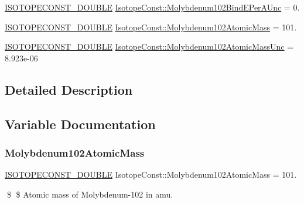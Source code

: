 \begin{DoxyCompactItemize}
\mbox{\hyperlink{group___isotope_const-_macros_ga8f45a7272ce02c0b4c65c44636ed719a}{I\+S\+O\+T\+O\+P\+E\+C\+O\+N\+S\+T\+\_\+\+D\+O\+U\+B\+LE}} \mbox{\hyperlink{group___isotope_const-_molybdenum-_mo102_ga053c88dbcae9cad5e8be1ad7f7e8f947}{Isotope\+Const\+::\+Molybdenum102\+Bind\+E\+Per\+A\+Unc}} = 0.
\item 
\mbox{\hyperlink{group___isotope_const-_macros_ga8f45a7272ce02c0b4c65c44636ed719a}{I\+S\+O\+T\+O\+P\+E\+C\+O\+N\+S\+T\+\_\+\+D\+O\+U\+B\+LE}} \mbox{\hyperlink{group___isotope_const-_molybdenum-_mo102_gaaacc2cb8568a3823fb5e4d5189ef7d54}{Isotope\+Const\+::\+Molybdenum102\+Atomic\+Mass}} = 101.
\item 
\mbox{\hyperlink{group___isotope_const-_macros_ga8f45a7272ce02c0b4c65c44636ed719a}{I\+S\+O\+T\+O\+P\+E\+C\+O\+N\+S\+T\+\_\+\+D\+O\+U\+B\+LE}} \mbox{\hyperlink{group___isotope_const-_molybdenum-_mo102_gacdcf42194c83c251a90b50d6511ea8f0}{Isotope\+Const\+::\+Molybdenum102\+Atomic\+Mass\+Unc}} = 8.\+923e-\/06
\end{DoxyCompactItemize}


\subsection{Detailed Description}


\subsection{Variable Documentation}
\mbox{\label{group___isotope_const-_molybdenum-_mo102_gaaacc2cb8568a3823fb5e4d5189ef7d54}} 
\subsubsection{\texorpdfstring{Molybdenum102\+Atomic\+Mass}{Molybdenum102AtomicMass}}
{\footnotesize\ttfamily \mbox{\hyperlink{group___isotope_const-_macros_ga8f45a7272ce02c0b4c65c44636ed719a}{I\+S\+O\+T\+O\+P\+E\+C\+O\+N\+S\+T\+\_\+\+D\+O\+U\+B\+LE}} Isotope\+Const\+::\+Molybdenum102\+Atomic\+Mass = 101.}

\$ \$ Atomic mass of Molybdenum-\/102 in amu. \mbox{\label{group___isotope_const-_molybdenum-_mo102_gacdcf42194c83c251a90b50d6511ea8f0}} 
